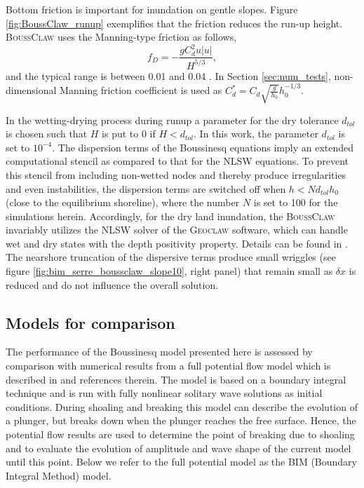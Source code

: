 \documentclass[review]{elsarticle}
\newcommand{\BoussClaw}{\textsc{BoussClaw} }
\begin{document}
Bottom friction is important for inundation on gentle slopes. 
Figure \ref{fig:BoussClaw_runup} 
exemplifies that the friction reduces the run-up height.
\BoussClaw uses the Manning-type friction as follows,
\begin{equation}
\label{eq:Manning}
f_D = -\frac{g C_d^2 u |u|}{H^{5/3}},
\end{equation}
and the typical range is between 0.01 and 0.04 \citep{te1959open}.
In Section \ref{sec:num_tests}, non-dimensional Manning friction
coefficient is used as $C_d^* = C_d \sqrt{\frac{g}{h_0}} h_0^{-1/3}$.

In the wetting-drying process during runup a parameter 
for the dry tolerance $d_{tol}$ is chosen
such that $H$ is put to $0$ if $H<d_{tol}$.
In this work, the parameter $d_{tol}$ is set to $10^{-4}$. 
The dispersion terms of the Boussinesq equations imply an extended computational
stencil as compared to that for the NLSW equations. To prevent this stencil 
from including non-wetted nodes and thereby produce irregularities and even instabilities, the dispersion terms are switched off when $h<Nd_{tol}h_0$ (close to the equilibrium shoreline), where the number $N$ is set to 100 for the simulations herein.
Accordingly, for the dry land inundation, the \BoussClaw invariably
utilizes the NLSW solver of the \textsc{Geoclaw} software,
which can handle 
wet and dry states with the depth positivity property.
Details can be found in \cite{george2008augmented}.
The nearshore truncation of the dispersive terms produce small wriggles (see figure \ref{fig:bim_serre_boussclaw_slope10}, right panel) that remain small as $\delta x$ is 
reduced and do not influence the overall solution. 


\subsection{Models for comparison}
The performance of the Boussinesq model presented here is 
assessed by comparison with numerical results from a full potential
flow model which is described in \citet{Lovholt:2013a} and references therein. The model is based on a boundary 
integral technique and is run  with fully nonlinear solitary
wave solutions as initial conditions. During shoaling and breaking this
model can describe the evolution of a plunger, but breaks down
when the plunger reaches the free surface. Hence, the potential flow 
results are used to determine the point of breaking due to shoaling 
and to
evaluate the evolution of  amplitude and wave 
shape of the current model until this point.   
Below we refer to the full potential model as the BIM (Boundary
 Integral Method) model.
\end{document}
